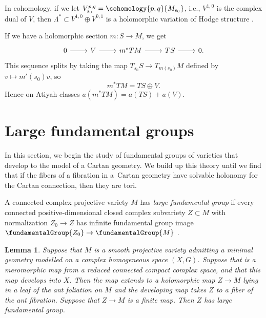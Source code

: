 \documentclass[10pt,a4paper]{amsart}
\numberwithin{equation}{section}
\newtheorem{Lemma}[Theorem]{Lemma}
\begin{document}
In cohomology, if we let $V^{p,q}_{s_0} = \cohomology{p,q}{M_{s_0}}$, i.e., $V^{1,0}$ is the complex dual of $V$, then $\Lambda^* \subset V^{1,0} \oplus V^{0,1}$ is a holomorphic variation of Hodge structure \cite[p. 249]{Voisin:2007a}.

If we have a holomorphic section $m \colon S \to M$, we get
\[
\begin{tikzcd}
0 \arrow{r} & V \arrow{r} & m^*TM \arrow{r} & TS \arrow{r} & 0.
\end{tikzcd}
\]
This sequence splits by taking the map $T_{s_0} S \longrightarrow T_{m(s_0)} M$ defined by
$v \longmapsto m'(s_0)v$, so
\[
m^* TM = TS \oplus V.
\]
Hence on Atiyah classes $a(m^*TM) = a(TS)+a(V)$.

\section{Large fundamental groups}\label{section:Large.fundamental.groups}
In this section, we begin the study of fundamental groups of varieties that develop to the model of a Cartan geometry.
We build up this theory until we find that if the fibers of a fibration in a~Cartan geometry have solvable holonomy for the Cartan connection, then they are tori.

A connected complex projective variety $M$ has \emph{large fundamental group} if every connected positive-dimensional closed
complex subvariety $Z \subset M$ with normalization $Z_0 \to Z$ has infinite fundamental group image $\fundamentalGroup{Z_0} \to \fundamentalGroup{M}$ \cite{Kollar:1993}.

\begin{Lemma}\label{lemma:dev.large}
Suppose that $M$ is a smooth projective variety admitting a minimal geometry modelled on a complex homogeneous space $(X, G)$.
Suppose that  is a meromorphic map from a reduced connected compact complex space, and that this map develops into $X$.
Then the map extends to a holomorphic map $Z \to M$ lying in a leaf of the ant foliation on $M$ and the developing map takes $Z$ to a fiber of the ant fibration.
Suppose that $Z \to M$ is a finite map.
Then $Z$ has large fundamental group.
\end{Lemma}
\end{document}
